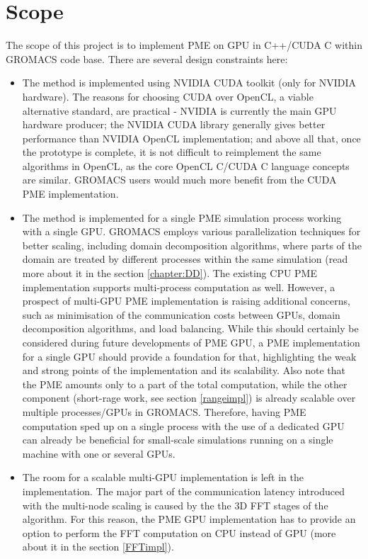 \documentclass[12pt,a4paper]{report}
\begin{document}
\section{Scope} \label{chapter_scope}

The scope of this project is to implement PME on GPU in C++/CUDA C within GROMACS code base.
There are several design constraints here:
\begin{itemize}
\item The method is implemented using NVIDIA CUDA toolkit (only for NVIDIA hardware). The reasons for choosing CUDA over OpenCL, a viable alternative standard, are practical - NVIDIA is currently the main GPU hardware producer; the NVIDIA CUDA library generally gives better performance than NVIDIA OpenCL implementation; and above all that, once the prototype is complete, it is not difficult to reimplement the same algorithms in OpenCL, as the core OpenCL C/CUDA C language concepts are similar. GROMACS users would much more benefit from the CUDA PME implementation.
\item The method is implemented for a single PME simulation process working with a single GPU. GROMACS employs various parallelization techniques for better scaling, including domain decomposition algorithms, where parts of the domain are treated by different processes within the same simulation (read more about it in the section \ref{chapter:DD}). The existing CPU PME implementation supports multi-process computation as well. 
However, a prospect of multi-GPU PME implementation is raising additional concerns, such as minimisation of the communication costs between GPUs, domain decomposition algorithms, and load balancing. While this should certainly be considered during future developments of PME GPU, a PME implementation for a single GPU should provide a foundation for that, highlighting the weak and strong points of the implementation and its scalability. 
Also note that the PME amounts only to a part of the total computation, while the other component (short-rage work, see section \ref{rangeimpl}) is already scalable over multiple processes/GPUs in GROMACS. Therefore, having PME computation sped up on a single process with the use of a dedicated GPU can already be beneficial for small-scale simulations running on a single machine with one or several GPUs.
\item The room for a scalable multi-GPU implementation is left in the implementation. The major part of the communication latency introduced with the multi-node scaling is caused by the the 3D FFT stages of the algorithm. For this reason, the PME GPU implementation has to provide an option to perform the FFT computation on CPU instead of GPU (more about it in the section \ref{FFTimpl}).

\end{itemize}
\iffalse
\end{document}
